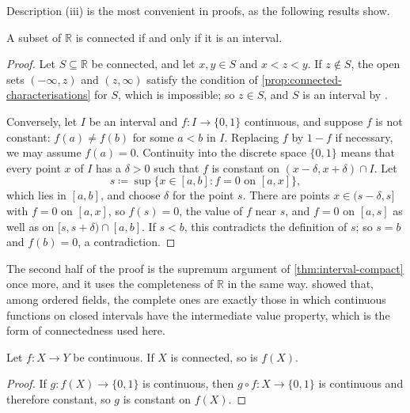 Description (iii) is the most convenient in proofs, as the following results show.

\begin{theorem}
\label{thm:connected-real}
A subset of $\mathbb R$ is connected if and only if it is an interval.
\end{theorem}

\begin{proof}
Let $S\subseteq\mathbb R$ be connected, and let $x,y\in S$ and $x<z<y$. If $z\notin S$, the open sets $(-\infty,z)$ and $(z,\infty)$ satisfy the condition of \cref{prop:connected-characterisations} for $S$, which is impossible; so $z\in S$, and $S$ is an interval by .

Conversely, let $I$ be an interval and $f\colon I\to\{0,1\}$ continuous, and suppose $f$ is not constant: $f(a)\ne f(b)$ for some $a<b$ in $I$. Replacing $f$ by $1-f$ if necessary, we may assume $f(a)=0$. Continuity into the discrete space $\{0,1\}$ means that every point $x$ of $I$ has a $\delta>0$ such that $f$ is constant on $(x-\delta,x+\delta)\cap I$. Let
\[
s\coloneqq\sup\{x\in[a,b]: f=0\text{ on }[a,x]\},
\]
which lies in $[a,b]$, and choose $\delta$ for the point $s$. There are points $x\in(s-\delta,s]$ with $f=0$ on $[a,x]$, so $f(s)=0$, the value of $f$ near $s$, and $f=0$ on $[a,s]$ as well as on $[s,s+\delta)\cap[a,b]$. If $s<b$, this contradicts the definition of $s$; so $s=b$ and $f(b)=0$, a contradiction.
\end{proof}

The second half of the proof is the supremum argument of \cref{thm:interval-compact} once more, and it uses the completeness of $\mathbb R$ in the same way.  showed that, among ordered fields, the complete ones are exactly those in which continuous functions on closed intervals have the intermediate value property, which is the form of connectedness used here.

\begin{theorem}
\label{thm:connected-image}
Let $f\colon X\to Y$ be continuous. If $X$ is connected, so is $f(X)$.
\end{theorem}

\begin{proof}
If $g\colon f(X)\to\{0,1\}$ is continuous, then $g\circ f\colon X\to\{0,1\}$ is continuous and therefore constant, so $g$ is constant on $f(X)$.
\end{proof}

